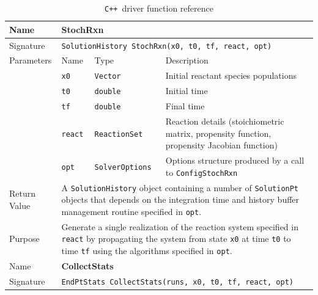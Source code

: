 \documentclass[12pt]{article}
\newcommand{\cpp}{\texttt{C++}}%
\newcommand{\api}[1]{\texttt{#1}}
\newcommand{\srccode}[1]{\texttt{#1}}
\begin{document}

\begin{table}%
  \begin{center}
    \caption{\cpp\ driver function reference} \label{cpp_driver_tab}
    \begin{tabular}{|p{0.75in}|p{0.5in}|p{1.125in}|p{2.625in}|}
      \hline
      Name & \multicolumn{3}{l|}{\textbf{StochRxn}} \\
      \hline
      Signature & \multicolumn{3}{l|}{
          \srccode{SolutionHistory StochRxn(x0, t0, tf, react, opt)}} \\
      \hline
      Parameters &  Name & Type & Description \\
      \cline{2-4}
                 &  \srccode{x0} & \srccode{Vector} &
                       Initial reactant species populations \\
                 &  \srccode{t0} & \srccode{double} &
                       Initial time \\
                 &  \srccode{tf} & \srccode{double} &
                       Final time \\
                 &  \srccode{react} & \srccode{ReactionSet} &
                       Reaction details (stoichiometric matrix, propensity
                       function, propensity Jacobian function) \\
                 &  \srccode{opt} & \srccode{SolverOptions} &
                       Options structure produced by a call to
                       \api{ConfigStochRxn} \\
      \hline
      Return Value & \multicolumn{3}{p{4.5in}|}{A \srccode{SolutionHistory}
                     object containing a number of \srccode{SolutionPt} objects
                     that depends on the integration time and history buffer
                     management routine specified in \srccode{opt}.}  \\
      \hline
      Purpose & \multicolumn{3}{p{4.5in}|}{Generate a single realization of the
                reaction system specified in \srccode{react} by propagating
                the system from state \srccode{x0} at time \srccode{t0} to
                time \srccode{tf} using the algorithms specified in
                \srccode{opt}.} \\
      \hline
      \hline
      Name & \multicolumn{3}{l|}{\textbf{CollectStats}} \\
      \hline
      Signature & \multicolumn{3}{l|}{
         \srccode{EndPtStats CollectStats(runs, x0, t0, tf, react, opt)}} \\

\end{tabular}
\end{center}
\end{table}
\end{document}

